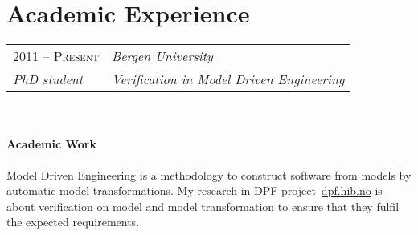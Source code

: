 \documentclass[10pt]{article} %
\begin{document}
{\begin{minipage}[t]{0.5\textwidth}

\section{Academic Experience} 

\begin{tabu}{L{65pt}R{180pt}} %
    
    
    \rowfont{\color{shade}}
    2011 -- \textsc{Present} & \textit{Bergen University}\\
     
    \rowfont{\color{shade}}
    \vspace{-1mm} \textit{PhD student} &  \vspace{-1mm} \textit{Verification in Model Driven Engineering}
\end{tabu}
\\
\linebreak



\paragraph{Academic Work}\normalsize{Model Driven Engineering is a methodology to construct software from models by automatic model transformations. My research in DPF project~\url{dpf.hib.no} is about verification on model and model transformation to ensure that they fulfil the expected requirements.}

\end{minipage}}
\end{document}
